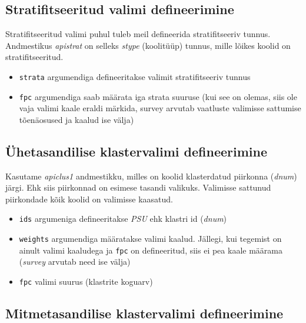 \documentclass[
]{book}
\providecommand{\tightlist}{%
  \setlength{\itemsep}{0pt}\setlength{\parskip}{0pt}}
\begin{document}
\hypertarget{stratifitseeritud-valimi-defineerimine}{%
\subsection{Stratifitseeritud valimi defineerimine}\label{stratifitseeritud-valimi-defineerimine}}

Stratifitseeritud valimi puhul tuleb meil defineerida stratifitseeriv tunnus. Andmestikus \emph{apistrat} on selleks \emph{stype} (koolitüüp) tunnus, mille lõikes koolid on stratifitseeritud.

\begin{itemize}
\tightlist
\item
  \texttt{strata} argumendiga defineeritakse valimit stratifitseeriv tunnus
\item
  \texttt{fpc} argumendiga saab määrata iga strata suuruse (kui see on olemas, siis ole vaja valimi kaale eraldi märkida, survey arvutab vaatluste valimisse sattumise tõenäosused ja kaalud ise välja)
\end{itemize}

\hypertarget{uxfchetasandilise-klastervalimi-defineerimine}{%
\subsection{Ühetasandilise klastervalimi defineerimine}\label{uxfchetasandilise-klastervalimi-defineerimine}}

Kasutame \emph{apiclus1} andmestikku, milles on koolid klasterdatud piirkonna (\emph{dnum}) järgi. Ehk siis piirkonnad on esimese tasandi valikuks. Valimisse sattunud piirkondade kõik koolid on valimisse kaasatud.

\begin{itemize}
\tightlist
\item
  \texttt{ids} argumeniga defineeritakse \emph{PSU} ehk klastri id (\emph{dnum})
\item
  \texttt{weights} argumendiga määratakse valimi kaalud. Jällegi, kui tegemist on ainult valimi kaaludega ja \texttt{fpc} on defineeritud, siis ei pea kaale määrama (\emph{survey} arvutab need ise välja)
\item
  \texttt{fpc} valimi suurus (klastrite koguarv)
\end{itemize}

\hypertarget{mitmetasandilise-klastervalimi-defineerimine}{%
\subsection{Mitmetasandilise klastervalimi defineerimine}\label{mitmetasandilise-klastervalimi-defineerimine}}
\end{document}
